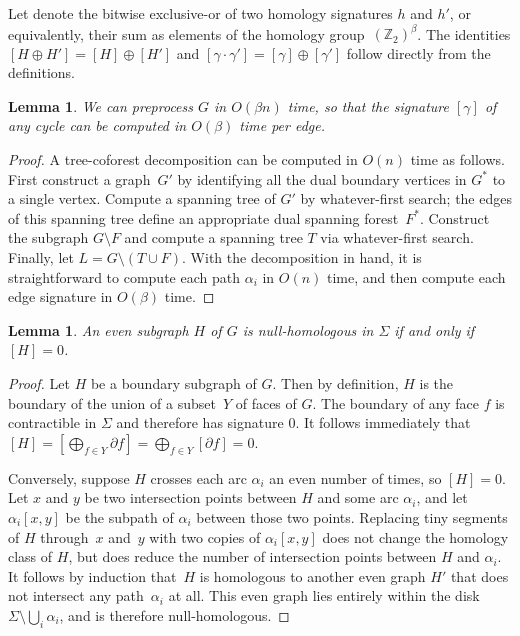 \documentclass[11pt,twoside]{article}
\def\Z{\mathbb{Z}}
\def\cycle{\gamma}
\def\dualarc{\alpha}
\newtheorem{lemma}[theorem]{Lemma}
\begin{document}
Let  denote the bitwise exclusive-or of two homology signatures $h$ and $h'$, or equivalently, their sum as elements of the homology group~$(\Z_2)^\beta$.  The identities $[H \oplus H'] = [H] \oplus [H']$ and $[\cycle\cdot\cycle'] = [\cycle] \oplus [\cycle']$ follow directly from the definitions.

\begin{lemma}
\label{lem:sign}
We can preprocess $G$ in $O(\beta n)$ time, so that the signature $[\cycle]$ of any cycle can be computed in $O(\beta)$ time per edge.
\end{lemma}

\begin{proof}
A tree-coforest decomposition can be computed in $O(n)$ time as follows.  First construct a graph~$G'$ by identifying all the dual boundary vertices in $G^*$ to a single vertex.  Compute a spanning tree of $G'$ by whatever-first search; the edges of this spanning tree define an appropriate dual spanning forest~$F^*$.  Construct the subgraph $G\setminus F$ and compute a spanning tree $T$ via whatever-first search.  Finally, let $L = G\setminus (T\cup F)$.  With the decomposition in hand, it is straightforward to compute each path $\dualarc_i$ in $O(n)$ time, and then compute each edge signature in $O(\beta)$ time.
\end{proof}

\begin{lemma}
An even subgraph $H$ of $G$ is null-homologous in $\Sigma$ if and only if $[H] = 0$.
\end{lemma}

\begin{proof}
Let $H$ be a boundary subgraph of $G$.  Then by definition, $H$ is the boundary of the union of a subset~$Y$ of faces of $G$.  The boundary of any face $f$ is contractible in $\Sigma$ and therefore has signature $0$.  It follows immediately that $[H] = [\bigoplus_{f\in Y} \partial f] = \bigoplus_{f\in Y} [\partial f] = 0$.

Conversely, suppose $H$ crosses each arc $\dualarc_i$ an even number of times, so $[H]=0$.  Let $x$ and $y$ be two intersection points between $H$ and some arc $\dualarc_i$, and let $\dualarc_i[x,y]$ be the subpath of $\dualarc_i$ between those two points.  Replacing tiny segments of $H$ through~$x$ and~$y$ with two copies of $\dualarc_i[x,y]$ does not change the homology class of $H$, but does reduce the number of intersection points between $H$ and $\dualarc_i$.  It follows by induction that~$H$ is homologous to another even graph $H'$ that does not intersect any path~$\dualarc_i$ at all.  This even graph lies entirely within the disk $\Sigma\setminus \bigcup_i\dualarc_i$, and is therefore null-homologous.
\end{proof}
\end{document}
